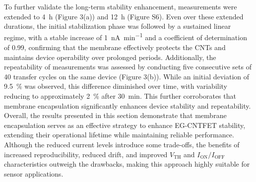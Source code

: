 {%
To further validate the long-term stability enhancement, measurements were extended to \SI{4}{\hour} (Figure 3(a)) and \SI{12}{\hour} (Figure S6). Even over these extended durations, the initial stabilization phase was followed by a sustained linear regime, with a stable increase of \SI{1}{\nano\ampere\per\minute} and a coefficient of determination of \SI{0.99}{}, confirming that the membrane effectively protects the CNTs and maintains device operability over prolonged periods.  
%
Additionally, the repeatability of measurements was assessed by conducting five consecutive sets of \num{40} transfer cycles on the same device (Figure 3(b)). While an initial deviation of \SI{9.5}{\percent} was observed, this difference diminished over time, with variability reducing to approximately \SI{2}{\percent} after \SI{30}{\minute}. This further corroborates that membrane encapsulation significantly enhances device stability and repeatability.  
%
Overall, the results presented in this section demonstrate that membrane encapsulation serves as an effective strategy to enhance EG-CNTFET stability, extending their operational lifetime while maintaining reliable performance. Although the reduced current levels introduce some trade-offs, the benefits of increased reproducibility, reduced drift, and improved $V_{\text{TH}}$ and $I_{\text{ON}}/I_{\text{OFF}}$ characteristics outweigh the drawbacks, making this approach highly suitable for sensor applications.
}
